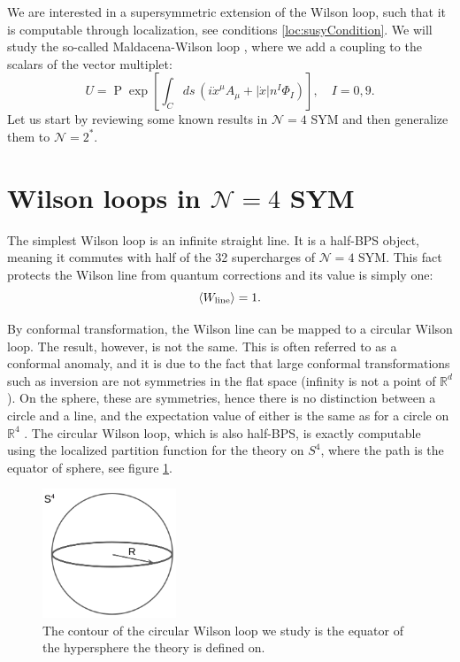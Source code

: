We are interested in a supersymmetric extension of the Wilson loop,
such that it is computable through localization, see conditions \eqref{loc:susyCondition}.
We will study the so-called Maldacena-Wilson loop \cite{Maldacena:1998im},
where we add a coupling to the scalars of the vector multiplet:
\begin{equation} \label{maldacenaWL}
 U = \mathop{\mathrm{P}}\exp 
    \left[ 
	\int_C ds\,
	\left(
	  i\dot{x}^\mu A_\mu +|\dot{x}|n^I\Phi_I 
	\right)
    \right], \quad I=0,9.
\end{equation}
Let us start by reviewing some known results in $\mathcal{N}=4$ SYM and then generalize them to $\mathcal{N}=2^*$.



\section{Wilson loops in $\mathcal{N}=4$ SYM}

The simplest Wilson loop is an infinite straight line. 
It is a half-BPS object, meaning it commutes with half of the 32 supercharges of $\mathcal{N}=4$ SYM.
This fact protects the Wilson line from quantum corrections and its value is simply one:
\begin{equation}
 \braket{W_\text{line}} = 1.
\end{equation}


By conformal transformation, the Wilson line can be mapped to a circular Wilson loop.
The result, however, is not the same. 
This is often referred to as a conformal anomaly, 
and it is due to the fact that large conformal transformations such as inversion are not symmetries in the flat space
(infinity is not a point of $\mathbb{R}^d$). 
On the sphere, these are symmetries, hence there is no distinction between a circle and a line, and the
expectation value of either is the same as for a circle on $\mathbb{R}^4$ \cite{Drukker:2000rr}.
The circular Wilson loop, which is also half-BPS, is exactly computable using the localized partition function for the theory on $S^4$,
where the path is the equator of sphere, see figure \ref{fig:equatorWL}.

\begin{figure}[t]
\begin{center}
 \centerline{\includegraphics[width=4cm]{Images/equatorWL.png}}
\end{center}
\caption{\label{fig:equatorWL} The contour of the circular Wilson loop we study is the equator of the hypersphere the theory is defined on.}
\end{figure}


